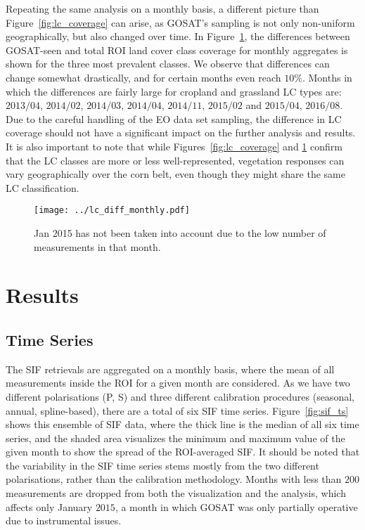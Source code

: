 \documentclass[preprint, a4paper, 10pt, times]{elsarticle}
\begin{document}
Repeating the same analysis on a monthly basis, a different picture than Figure~\ref{fig:lc_coverage} can arise, as GOSAT's sampling is not only non-uniform geographically, but also changed over time. In Figure~\ref{fig:lc_diff_monthly}, the differences between GOSAT-seen and total ROI land cover class coverage for monthly aggregates is shown for the three most prevalent classes. We observe that differences can change somewhat drastically, and for certain months even reach $10\%$. Months in which the differences are fairly large for cropland and grassland LC types are: $2013/04$, $2014/02$, $2014/03$, $2014/04$, $2014/11$, $2015/02$ and $2015/04$, $2016/08$. Due to the careful handling of the EO data set sampling, the difference in LC coverage should not have a significant impact on the further analysis and results. It is also important to note that while Figures~\ref{fig:lc_coverage} and \ref{fig:lc_diff_monthly} confirm that the LC classes are more or less well-represented, vegetation responses can vary geographically over the corn belt, even though they might share the same LC classification.

 
\begin{figure}[htbp]
\centering
\texttt{[image: ../lc\_diff\_monthly.pdf]}
\caption{Jan 2015 has not been taken into account due to the low number of measurements in that month.}
\label{fig:lc_diff_monthly}
\end{figure}

 
\section{Results}

\subsection{Time Series}

The SIF retrievals are aggregated on a monthly basis, where the mean of all measurements inside the ROI for a given month are considered. As we have two different polarisations (P, S) and three different calibration procedures (seasonal, annual, spline-based), there are a total of six SIF time series. Figure~\ref{fig:sif_ts} shows this ensemble of SIF data, where the thick line is the median of all six time series, and the shaded area visualizes the minimum and maximum value of the given month to show the spread of the ROI-averaged SIF. It should be noted that the variability in the SIF time series stems mostly from the two different polarisations, rather than the calibration methodology. Months with less than $200$ measurements are dropped from both the visualization and the analysis, which affects only January $2015$, a month in which GOSAT was only partially operative due to instrumental issues.
\end{document}
